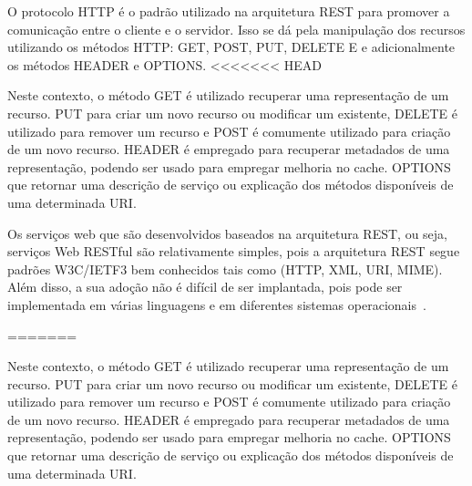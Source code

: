 O protocolo HTTP é o padrão utilizado na arquitetura REST para promover a comunicação entre o cliente e o servidor. Isso se dá pela manipulação dos recursos utilizando os métodos HTTP: GET, POST, PUT, DELETE E e adicionalmente os métodos HEADER e OPTIONS.
<<<<<<< HEAD

Neste contexto, o método GET é utilizado recuperar uma representação de um recurso. PUT para criar um novo recurso ou modificar um existente, DELETE é utilizado para remover um recurso e POST é comumente utilizado para criação de um novo recurso. HEADER é empregado para recuperar metadados de uma representação, podendo ser usado para empregar melhoria no cache. OPTIONS que retornar uma descrição de serviço ou explicação dos métodos disponíveis de uma determinada URI.



%

Os serviços web que são desenvolvidos baseados na arquitetura REST, ou seja, serviços Web RESTful  são relativamente simples, pois a arquitetura REST segue padrões W3C/IETF3 bem conhecidos tais como (HTTP, XML, URI, MIME). Além disso, a sua adoção não é difícil de ser implantada, pois pode ser implementada em várias linguagens e em diferentes sistemas operacionais~\cite{Pautasso2008}.

=======

Neste contexto, o método GET é utilizado recuperar uma representação de um recurso. PUT para criar um novo recurso ou modificar um existente, DELETE é utilizado para remover um recurso e POST é comumente utilizado para criação de um novo recurso. HEADER é empregado para recuperar metadados de uma representação, podendo ser usado para empregar melhoria no cache. OPTIONS que retornar uma descrição de serviço ou explicação dos métodos disponíveis de uma determinada URI.

